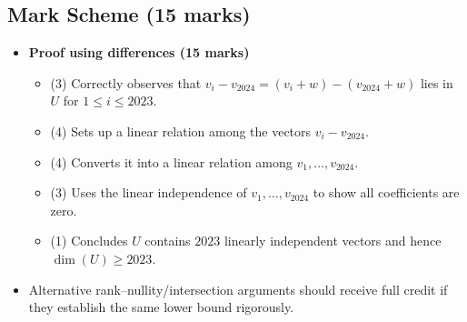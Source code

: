 \documentclass[12pt]{article}
\begin{document}
\subsection{Mark Scheme (15 marks)}
\begin{itemize}[leftmargin=1.6em]
  \item \textbf{Proof using differences (15 marks)}
  \begin{itemize}[leftmargin=1.6em]
    \item (3) Correctly observes that $v_i-v_{2024}=(v_i+w)-(v_{2024}+w)$ lies in $U$ for $1\le i\le2023$.
    \item (4) Sets up a linear relation among the vectors $v_i-v_{2024}$.
    \item (4) Converts it into a linear relation among $v_1,\ldots,v_{2024}$.
    \item (3) Uses the linear independence of $v_1,
\ldots,v_{2024}$ to show all coefficients are zero.
    \item (1) Concludes $U$ contains $2023$ linearly independent vectors and hence $\dim(U)\ge2023$.
  \end{itemize}
  \item Alternative rank--nullity/intersection arguments should receive full credit if they establish the same lower bound rigorously.
\end{itemize}
\end{document}
